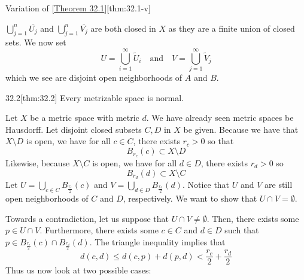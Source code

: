 \begin{thmBox}{Variation of [\hyperlink{thm:32.1}{Theorem 32.1}]}[thm:32.1-v]
\begin{proofBox}
        \( \bigcup_{ j = 1 }^{ n } \overline{ U_{ j } } \) and
        \( \bigcup_{ j = 1 }^{ n } \overline{ V_{ j } } \)
        are both closed in \( X \) as they are a finite union of closed sets. 
        We now set
        \begin{equation*}
            U
            =
            \bigcup_{ i = 1 }^{ \infty } \tilde{U}_{ i }
            \quad \mathrm{and} \quad 
            V
            =
            \bigcup_{ j = 1 }^{ \infty } \tilde{V}_{ j }
        \end{equation*}
        which we see are disjoint open neighborhoods of \( A \) and \( B \).
    \end{proofBox}
\end{thmBox}

\begin{thmBox}{32.2}[thm:32.2]
    Every metrizable space is normal.

    \baseRule

    \begin{proofBox}
        Let \( X \) be a metric space with metric \( d \).
        We have already seen metric spaces be Hausdorff.
        Let disjoint closed subsets \( C, D \) in \( X \) be given.
        Because we have that \( X \setminus D \) is open, we have for all
        \( c \in C \), there exists \( r_{ c } > 0 \) so that 
        \begin{equation*}
            B_{ r_{ c } }( c ) \subset X \setminus D
        \end{equation*}
        Likewise, because \( X \setminus C \) is open, we have for all
        \( d \in D \), there exists \( r_{ d } > 0 \) so
        \begin{equation*}
            B_{ r_{ d } }( d ) \subset X \setminus C    
        \end{equation*}
        Let \( U = \bigcup_{ c \in C } B_{ \frac{ r_{ c } }{ 2 } }( c ) \) and
        \( V = \bigcup_{ d \in D } B_{ \frac{ r_{ d } }{ 2 } }( d ) \).
        Notice that \( U \) and \( V \) are still open neighborhoods of
        \( C \) and \( D \), respectively.
        We want to show that \( U \cap V = \emptyset \).

        \baseSkip

        Towards a contradiction, let us suppose that
        \( U \cap V \neq \emptyset \).
        Then, there exists some \( p \in U \cap V \).
        Furthermore, there exists some \( c \in C \) and \( d \in D \) such that
        \( p \in B_{ \frac{ r_{ c } }{ 2 } }( c ) \cap B_{ \frac{ r_{ d } }{ 2 } }( d ) \).
        The triangle inequality implies that 
        \begin{equation*}
            d( c, d )
            \leq 
            d ( c, p ) + d(  p, d )
            < \frac{ r_{ c } }{ 2 } + \frac{ r_{ d } }{ 2 }
        \end{equation*}
        Thus us now look at two possible cases:


\end{proofBox}
\end{thmBox}
